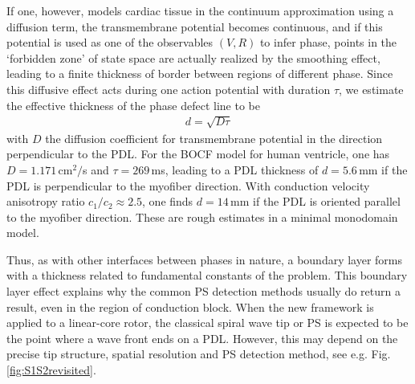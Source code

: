 \documentclass{article}
\begin{document}
If one, however, models cardiac tissue in the continuum approximation using a diffusion term, the transmembrane potential becomes continuous, and if this potential is used as one of the observables $(V,R)$ to infer phase, points in the `forbidden zone' of state space are actually realized by the smoothing effect, leading to a finite thickness of border between regions of different phase. Since this diffusive effect acts during one action potential with duration $\tau$, we estimate the effective thickness of the phase defect line to be
\begin{align}
    d = \sqrt{D \tau}
\end{align}
with $D$ the diffusion coefficient for transmembrane potential in the direction perpendicular to the PDL. For the BOCF model for human ventricle, one has $D=1.171\,$cm$^2/$s and $\tau = 269\,$ms, leading to a PDL thickness of $d=5.6$\,mm if the PDL is perpendicular to the myofiber direction. With conduction velocity anisotropy ratio $c_1/c_2 \approx 2.5$, one finds $d=14\,$mm if the PDL is oriented parallel to the myofiber direction. These are rough estimates in a minimal monodomain model. 

Thus, as with other interfaces between phases in nature, a boundary layer forms with a thickness related to fundamental constants of the problem. This boundary layer effect explains why the common PS detection methods usually do return a result, even in the region of conduction block. When the new framework is applied to a linear-core rotor, the classical spiral wave tip or PS is expected to be the point where a wave front ends on a PDL. However, this may depend on the precise tip structure, spatial resolution and PS detection method, see e.g. Fig. \ref{fig:S1S2revisited}. 

\end{document}
